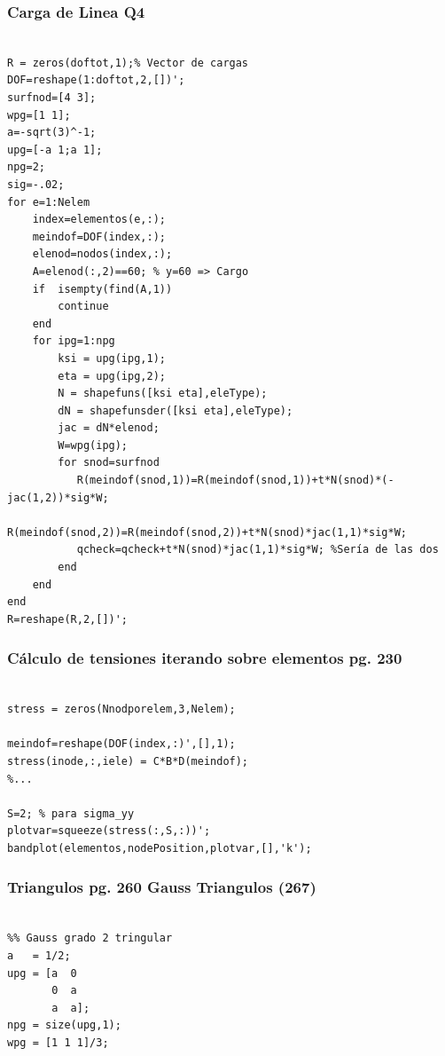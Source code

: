\subsubsection*{Carga de Linea Q4 }

\begin{code}
\begin{verbatim}
    
R = zeros(doftot,1);% Vector de cargas
DOF=reshape(1:doftot,2,[])';
surfnod=[4 3];
wpg=[1 1];
a=-sqrt(3)^-1;
upg=[-a 1;a 1];
npg=2;
sig=-.02;
for e=1:Nelem
    index=elementos(e,:);
    meindof=DOF(index,:);
    elenod=nodos(index,:);
    A=elenod(:,2)==60; % y=60 => Cargo
    if  isempty(find(A,1))
        continue
    end
    for ipg=1:npg
        ksi = upg(ipg,1);
        eta = upg(ipg,2);
        N = shapefuns([ksi eta],eleType);
        dN = shapefunsder([ksi eta],eleType);
        jac = dN*elenod;
        W=wpg(ipg);
        for snod=surfnod
           R(meindof(snod,1))=R(meindof(snod,1))+t*N(snod)*(-jac(1,2))*sig*W;
           R(meindof(snod,2))=R(meindof(snod,2))+t*N(snod)*jac(1,1)*sig*W;
           qcheck=qcheck+t*N(snod)*jac(1,1)*sig*W; %Sería de las dos
        end
    end
end
R=reshape(R,2,[])';
\end{verbatim}
\end{code}
    
\subsubsection{Cálculo de tensiones iterando sobre elementos pg. 230}
\begin{code}
\begin{verbatim}

stress = zeros(Nnodporelem,3,Nelem);

meindof=reshape(DOF(index,:)',[],1);
stress(inode,:,iele) = C*B*D(meindof);
%...

S=2; % para sigma_yy
plotvar=squeeze(stress(:,S,:))';
bandplot(elementos,nodePosition,plotvar,[],'k');
\end{verbatim}
\end{code}

\subsubsection{Triangulos pg. 260  Gauss Triangulos (267)}
\begin{code}
\begin{verbatim}
    
%% Gauss grado 2 tringular
a   = 1/2;
upg = [a  0
       0  a
       a  a];    
npg = size(upg,1);
wpg = [1 1 1]/3;
\end{verbatim}
\end{code}
